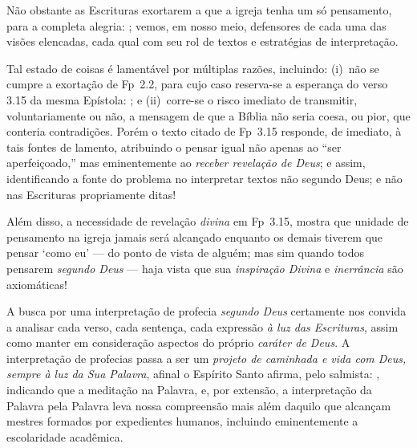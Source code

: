     Não obstante as Escrituras exortarem a que a igreja tenha um só pensamento, para a completa alegria: ; vemos, em nosso meio, defensores de cada uma das visões elencadas,  cada  qual  com  seu  rol  de
    textos e estratégias de interpretação.

    Tal estado de coisas é lamentável por múltiplas razões, incluindo: (i)~não se cumpre a exortação de Fp~2.2, para  cujo  caso
    reserva-se a esperança do verso 3.15 da mesma Epístola: ; e  (ii)~corre-se
    o risco imediato de transmitir, voluntariamente ou não, a mensagem de que a Bíblia não seria coesa, ou  pior,  que  conteria
    contradições. Porém o texto citado de Fp~3.15 responde, de imediato, à tais fontes de lamento, atribuindo o pensar igual não
    apenas ao ``ser aperfeiçoado,'' mas eminentemente ao \emph{receber revelação de Deus}; e assim,  identificando  a  fonte  do
    problema no interpretar textos não segundo Deus; e não nas Escrituras propriamente ditas!

    Além disso, a necessidade de revelação \emph{divina} em Fp~3.15, mostra que unidade de  pensamento  na  igreja  jamais  será
    alcançado enquanto os demais tiverem que pensar `como eu' --- do ponto de vista de alguém; mas  sim  quando  todos  pensarem
    \emph{segundo Deus} --- haja vista que sua \emph{inspiração Divina} e \emph{inerrância} são axiomáticas!

    A busca por uma interpretação de profecia \emph{segundo Deus} certamente nos convida a analisar cada verso,  cada  sentença,
    cada expressão \emph{à luz das Escrituras}, assim como manter em consideração aspectos do próprio \emph{caráter de Deus}.  A
    interpretação de profecias passa a ser um \emph{projeto de caminhada e vida com Deus, sempre à luz da Sua Palavra}, afinal o
    Espírito Santo afirma, pelo salmista: , indicando que a meditação na Palavra, e,  por  extensão,  a  interpretação  da  Palavra  pela
    Palavra leva nossa compreensão  mais  além  daquilo  que  alcançam  mestres  formados  por  expedientes  humanos,  incluindo
    eminentemente a escolaridade acadêmica.

